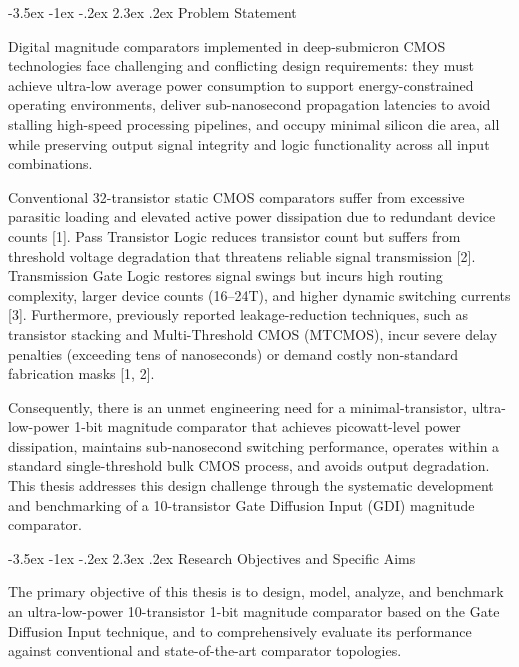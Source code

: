 \documentclass[12pt,a4paper,oneside]{report}
\makeatletter
\renewcommand\section{\@startsection {section}{1}{\z@}%
                                   {-3.5ex \@plus -1ex \@minus -.2ex}%
                                   {2.3ex \@plus.2ex}%
                                   {\normalfont\normalsize\bfseries}}
\makeatother
\begin{document}
\section{Problem Statement}

Digital magnitude comparators implemented in deep-submicron CMOS technologies face challenging and conflicting design requirements: they must achieve ultra-low average power consumption to support energy-constrained operating environments, deliver sub-nanosecond propagation latencies to avoid stalling high-speed processing pipelines, and occupy minimal silicon die area, all while preserving output signal integrity and logic functionality across all input combinations.

Conventional 32-transistor static CMOS comparators suffer from excessive parasitic loading and elevated active power dissipation due to redundant device counts [1]. Pass Transistor Logic reduces transistor count but suffers from threshold voltage degradation that threatens reliable signal transmission [2]. Transmission Gate Logic restores signal swings but incurs high routing complexity, larger device counts (16--24T), and higher dynamic switching currents [3]. Furthermore, previously reported leakage-reduction techniques, such as transistor stacking and Multi-Threshold CMOS (MTCMOS), incur severe delay penalties (exceeding tens of nanoseconds) or demand costly non-standard fabrication masks [1, 2].

Consequently, there is an unmet engineering need for a minimal-transistor, ultra-low-power 1-bit magnitude comparator that achieves picowatt-level power dissipation, maintains sub-nanosecond switching performance, operates within a standard single-threshold bulk CMOS process, and avoids output degradation. This thesis addresses this design challenge through the systematic development and benchmarking of a 10-transistor Gate Diffusion Input (GDI) magnitude comparator.

\section{Research Objectives and Specific Aims}

The primary objective of this thesis is to design, model, analyze, and benchmark an ultra-low-power 10-transistor 1-bit magnitude comparator based on the Gate Diffusion Input technique, and to comprehensively evaluate its performance against conventional and state-of-the-art comparator topologies.
\end{document}
